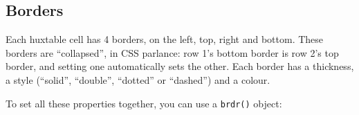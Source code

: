 \documentclass[]{article}
\newenvironment{Shaded}{\begin{snugshade}}{\end{snugshade}}
\newcommand{\DecValTok}[1]{\textcolor[rgb]{0.00,0.00,0.81}{#1}}
\newcommand{\KeywordTok}[1]{\textcolor[rgb]{0.13,0.29,0.53}{\textbf{#1}}}
\newcommand{\NormalTok}[1]{#1}
\newcommand{\OperatorTok}[1]{\textcolor[rgb]{0.81,0.36,0.00}{\textbf{#1}}}
\newcommand{\StringTok}[1]{\textcolor[rgb]{0.31,0.60,0.02}{#1}}
\begin{document}
\hypertarget{borders}{%
\subsection{Borders}\label{borders}}

Each huxtable cell has 4 borders, on the left, top, right and bottom.
These borders are ``collapsed'', in CSS parlance: row 1's bottom border
is row 2's top border, and setting one automatically sets the other.
Each border has a thickness, a style (``solid'', ``double'', ``dotted''
or ``dashed'') and a colour.

To set all these properties together, you can use a \texttt{brdr()}
object:

\begin{Shaded}
\end{Shaded}

 
  \providecommand{\huxb}[2]{\arrayrulecolor[RGB]{#1}\global\arrayrulewidth=#2pt}
  \providecommand{\huxvb}[2]{\color[RGB]{#1}\vrule width #2pt}
  \providecommand{\huxtpad}[1]{\rule{0pt}{#1}}
  \providecommand{\huxbpad}[1]{\rule[-#1]{0pt}{#1}}
\end{document}
